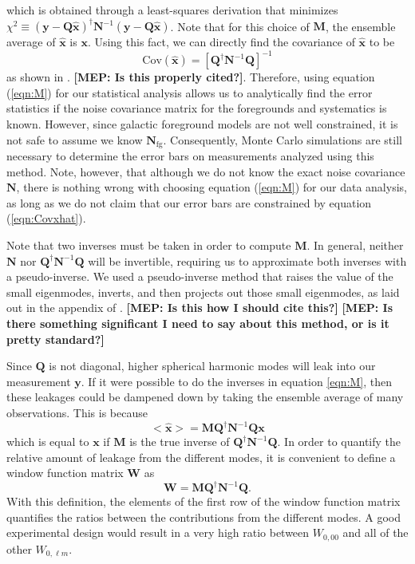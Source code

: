 \documentclass[twolcolumn,apj]{emulateapj}
\newcommand{\x}{\mathbf{x}}
\newcommand{\xhat}{\hat{\mathbf{x}}}
\newcommand{\y}{\mathbf{y}}
\newcommand{\N}{\mathbf{N}}
\newcommand{\Q}{\mathbf{Q}}
\newcommand{\M}{\mathbf{M}}
\newcommand{\W}{\mathbf{W}}
\newcommand{\mep}[1]{{\color{applegreen} \textbf{[MEP:  #1]}}}
\begin{document}
which is obtained through a least-squares derivation that minimizes $\chi^2 \equiv (\y-\Q \mathbf{\hat x})^\dagger \N^{-1} (\y-\Q \mathbf{\hat x})$. Note that for this choice of $\M$, the ensemble average of $\mathbf{\hat x}$ is $\mathbf{x}$.
Using this fact, we can directly find the covariance of $\mathbf{\hat x}$ to be 
\begin{equation}
\textrm{Cov}(\mathbf{\hat x}) = [\Q^\dagger \N^{-1} \Q]^{-1}
\label{eqn:Covxhat}
\end{equation}
as shown in \citet{Tegmark_CMB_maps_wli}. \mep{Is this properly cited?}. Therefore, using equation (\ref{eqn:M}) for our statistical analysis allows us to analytically find the error statistics if the noise covariance matrix for the foregrounds and systematics is known. However, since galactic foreground models are not well constrained, it is not safe to assume we know $\N_{\textrm{fg}}$. Consequently, Monte Carlo simulations are still necessary to determine the error bars on measurements analyzed using this method. Note, however, that although we do not know the exact noise covariance $\N$, there is nothing wrong with choosing equation (\ref{eqn:M}) for our data analysis, as long as we do not claim that our error bars are constrained by equation (\ref{eqn:Covxhat}). %

Note that two inverses must be taken in order to compute $\M$. In general, neither $\N$ nor $\Q^\dagger \N^{-1} \Q$ will be invertible, requiring us to approximate both inverses with a pseudo-inverse. We used a pseudo-inverse method that raises the value of the small eigenmodes, inverts, and then projects out those small eigenmodes, as laid out in the appendix of \citet{Tegmark_CMB_spectra_wli}. \mep{Is this how I should cite this?} \mep{Is there something significant I need to say about this method, or is it pretty standard?}

Since $\Q$ is not diagonal, higher spherical harmonic modes will leak into our measurement $\y$. If it were possible to do the inverses in equation \ref{eqn:M}, then these leakages could be dampened down by taking the ensemble average of many observations. This is because 
\begin{equation}
<\xhat> = \M \Q^\dagger \N^{-1} \Q \x
\end{equation}
which is equal to $\x$ if $\M$ is the true inverse of $\Q^\dagger \N^{-1} \Q$. In order to quantify the relative amount of leakage from the different modes, it is convenient to define a window function matrix $\W$ as 
\begin{equation}
\W = \M \Q^\dagger \N^{-1} \Q. 
\end{equation}
With this definition, the elements of the first row of the window function matrix quantifies the ratios between the contributions from the different modes. A good experimental design would result in a very high ratio between $W_{0,00}$ and all of the other $W_{0,\ell m}$.
\end{document}
